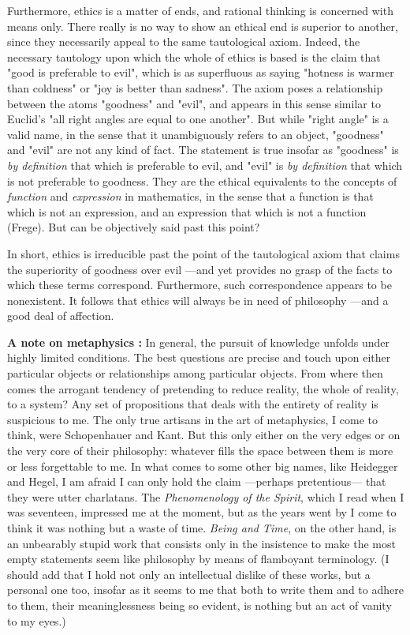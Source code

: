 \documentclass[a4paper]{article}
\begin{document}
Furthermore, ethics is a matter of ends, and rational thinking is concerned with
means only. There really is no way to show an ethical end is superior to
another, since they necessarily appeal to the same tautological axiom. Indeed,
the necessary tautology upon which the whole of ethics is based is the claim
that "good is preferable to evil", which is as superfluous as saying "hotness is
warmer than coldness" or "joy is better than sadness". The axiom poses a
relationship between the atoms "goodness" and "evil", and appears in this sense
similar to Euclid's "all right angles are equal to one another". But while
"right angle" is a valid name, in the sense that it unambiguously refers to an
object, "goodness" and "evil" are not any kind of fact. The statement is true
insofar as "goodness" is \textit{by definition} that which is preferable to
evil, and "evil" is \textit{by definition} that which is not preferable to
goodness. They are the ethical equivalents to the concepts of \textit{function}
and \textit{expression} in mathematics, in the sense that a function is that
which is not an expression, and an expression that which is not a function
(Frege). But can be objectively said past this point?

In short, ethics is irreducible past the point of the tautological axiom that
claims the superiority of goodness over evil ---and yet provides no grasp of the
facts to which these terms correspond. Furthermore, such correspondence appears
to be nonexistent. It follows that ethics will always be in need of philosophy
---and a good deal of affection. 

\textbf{A note on metaphysics : } In general, the pursuit of knowledge unfolds
under highly limited conditions. The best questions are precise and touch upon
either particular objects or relationships among particular objects. From where
then comes the arrogant tendency of pretending to reduce reality, the whole of
reality, to a system? Any set of propositions that deals with the entirety of
reality is suspicious to me. The only true artisans in the art of metaphysics, I
come to think, were Schopenhauer and Kant. But this only either on the very
edges or on the very core of their philosophy: whatever fills the space between
them is more or less forgettable to me. In what comes to some other big names,
like Heidegger and Hegel, I am afraid I can only hold the claim ---perhaps
pretentious--- that they were utter charlatans. The \textit{Phenomenology of the
Spirit}, which I read when I was seventeen, impressed me at the moment, but as
the years went by I come to think it was nothing but a waste of time.
\textit{Being and Time}, on the other hand, is an unbearably stupid work that
consists only in the insistence to make the most empty statements seem like
philosophy by means of flamboyant terminology. (I should add that I hold not
only an intellectual dislike of these works, but a personal one too, insofar as
it seems to me that both to write them and to adhere to them, their
meaninglessness being so evident, is nothing but an act of vanity to my eyes.)
\end{document}

